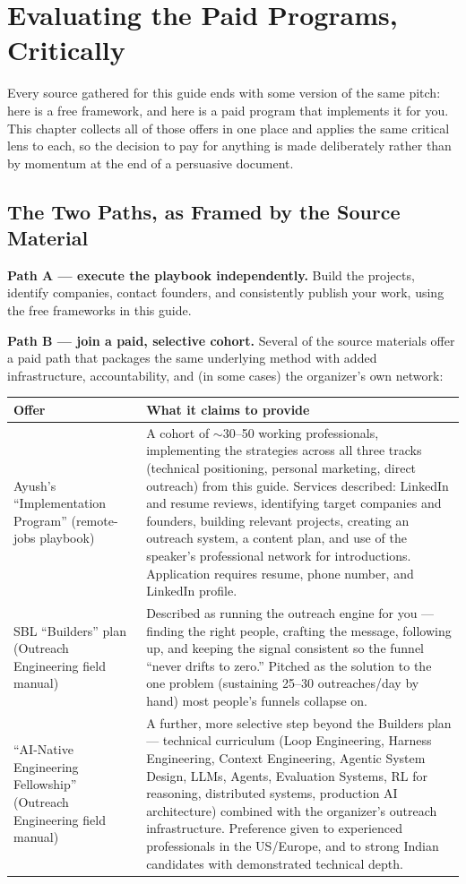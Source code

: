 \chapter{Evaluating the Paid Programs, Critically}
\label{ch:evaluating-programs}

Every source gathered for this guide ends with some version of the same pitch: here is a free framework, and here
is a paid program that implements it for you. This chapter collects all of those offers in one place and applies
the same critical lens to each, so the decision to pay for anything is made deliberately rather than by momentum
at the end of a persuasive document.

\section{The Two Paths, as Framed by the Source Material}

\textbf{Path A --- execute the playbook independently.} Build the projects, identify companies, contact founders,
and consistently publish your work, using the free frameworks in this guide.

\textbf{Path B --- join a paid, selective cohort.} Several of the source materials offer a paid path that
packages the same underlying method with added infrastructure, accountability, and (in some cases) the
organizer's own network:

\begin{longtable}{p{} p{}}
\toprule
\textbf{Offer} & \textbf{What it claims to provide} \\
\midrule
\endhead
Ayush's ``Implementation Program'' (remote-jobs playbook) & A cohort of $\sim$30--50 working professionals,
implementing the strategies across all three tracks (technical positioning, personal marketing, direct outreach)
from this guide. Services described: LinkedIn and resume reviews, identifying target companies and founders,
building relevant projects, creating an outreach system, a content plan, and use of the speaker's professional
network for introductions. Application requires resume, phone number, and LinkedIn profile. \\
SBL ``Builders'' plan (Outreach Engineering field manual) & Described as running the outreach engine for you ---
finding the right people, crafting the message, following up, and keeping the signal consistent so the funnel
``never drifts to zero.'' Pitched as the solution to the one problem (sustaining 25--30 outreaches/day by hand)
most people's funnels collapse on. \\
``AI-Native Engineering Fellowship'' (Outreach Engineering field manual) & A further, more selective step beyond
the Builders plan --- technical curriculum (Loop Engineering, Harness Engineering, Context Engineering, Agentic
System Design, LLMs, Agents, Evaluation Systems, RL for reasoning, distributed systems, production AI
architecture) combined with the organizer's outreach infrastructure. Preference given to experienced
professionals in the US/Europe, and to strong Indian candidates with demonstrated technical depth. \\
\bottomrule
\end{longtable}

